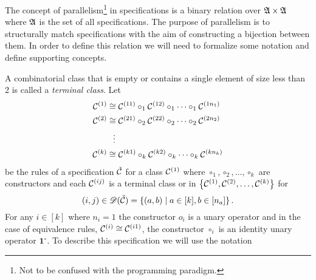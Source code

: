 \label{ch:parallel}
The concept of parallelism\footnote{Not to be confused with the programming paradigm.} in specifications is a binary relation over $\mathfrak{A} \times \mathfrak{A}$ where $\mathfrak{A}$ is the set of all specifications. The purpose of parallelism is to structurally match specifications with the aim of constructing a bijection between them. In order to define this relation  we will need to formalize some notation and define supporting concepts.

A combinatorial class that is empty or contains a single element of size less than 2 is called a \emph{terminal class}. Let
\begin{align*}
    \mathcal{C}^{\left(1\right)} &\cong \mathcal{C}^{\left(11\right)} \circ_1 \mathcal{C}^{\left(12\right)} \circ_1 \dotsm \circ_1 \mathcal{C}^{\left(1n_1\right)}\\
    \mathcal{C}^{\left(2\right)} &\cong \mathcal{C}^{\left(21\right)} \circ_2 \mathcal{C}^{\left(22\right)} \circ_2 \dotsm \circ_2 \mathcal{C}^{\left(2n_2\right)}\\
    &\hspace{0.25cm}\vdots\\
    \mathcal{C}^{\left(k\right)} &\cong \mathcal{C}^{\left(k1\right)} \circ_k \mathcal{C}^{\left(k2\right)} \circ_k \dotsm \circ_k \mathcal{C}^{\left(kn_k\right)}\\
\end{align*}
be the rules of a specification $\check{\mathcal{C}}$ for a class $\mathcal{C}^{\left(1\right)}$ where $\circ_1,\circ_2,\dotsc,\circ_k$ are constructors and each $\mathcal{C}^{\left(ij\right)}$ is a terminal class or in $\left\{\mathcal{C}^{\left(1\right)}, \mathcal{C}^{\left(2\right)}, \dotsc, \mathcal{C}^{\left(k\right)}\right\}$ for
\[
    (i,j) \in \mathscr{D}(\check{\mathcal{C}}) = \left\{(a,b) \mid a \in [k], b \in [n_a]\right\}.
\]
For any $i\in[k]$ where $n_i=1$ the constructor $o_i$ is a unary operator and in the case of equivalence rules, $\mathcal{C}^{\left(i\right)} \cong \mathcal{C}^{\left(i1\right)}$, the constructor $\circ_i$ is an identity unary operator $\mathbf{1}^\circ$. To describe this specification we will use the notation 

